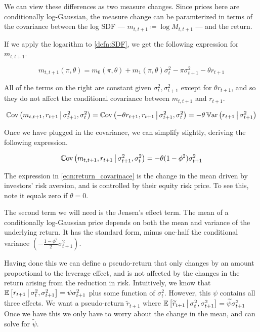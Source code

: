 \documentclass[11pt, letterpaper, twoside, final]{article}
\begin{document}
We can view these differences as two measure changes.
Since prices here are conditionally log-Gaussian, the measure change  can be paramterized in terms of the
covariance between the log SDF --- $m_{t,t+1} \coloneqq \log M_{t,t+1}$ --- and the return.

If we apply the logarithm to \cref{defn:SDF}, we get the following expression for $m_{t,t+1}$.

\begin{equation}
    \label{eqn:log_sdf}
        m_{t,t+1}(\pi, \theta) = m_{0}(\pi, \theta) + m_1(\pi, \theta) \sigma_t^2 - \pi \sigma^2_{t+1} - \theta
        r_{t+1}
\end{equation}

All of the terms on the right are constant given $\sigma^2_t, \sigma^2_{t+1}$ except for $\theta r_{t+1}$, and so
they do not affect the conditional covariance between $m_{t,t+1}$ and $r_{t+1}$.

\begin{equation}
    \Cov\left(m_{t,t+1}, r_{t+1} \mvert \sigma^2_{t+1}, \sigma^2_t \right)   
%
    = \Cov\left(-\theta r_{t+1}, r_{t+1} \mvert \sigma^2_{t+1}, \sigma^2_t \right)   
%
    = -\theta \Var\left(r_{t+1} \mvert \sigma^2_{t+1}\right)   
\end{equation}

Once we have plugged in the covariance, we can simplify slightly, deriving the following expression.

\begin{equation}
    \label{eqn:return_covarinace}
    \Cov\left(m_{t,t+1}, r_{t+1} \mvert \sigma^2_{t+1}, \sigma^2_t \right)   
%
    = -\theta (1 - \phi^2) \sigma^2_{t+1} 
\end{equation}

The expression in \cref{eqn:return_covarinace} is the change in the mean driven by investors' risk aversion, and
is controlled by their equity risk price.
To see this, note it equals zero if $\theta = 0$.

The second term we will need is the Jensen's effect term.
The mean of a conditionally log-Gaussian price depends on both the mean and variance of the underlying return.
It has the standard form, minus one-half the conditional variance $\left(-\frac{1 - \phi^2}{2}
\sigma^2_{t+1}\right)$. 

Having done this we can define a pseudo-return that only changes by an amount proportional to the leverage
effect, and is not affected by the changes in the return arising from the reduction in risk.
Intuitively, we know that $\operatorname{\mathbb{E}}\left[r_{t+1} \,\middle\vert\, \sigma^2_t, \sigma^2_{t+1} \right] = \psi \sigma^2_{t+1}$
plus some function  of $\sigma^2_t$.
However, this $\psi$ contains all three effects.
We want a pseudo-return $\widetilde{r}_{t+1}$ where $\operatorname{\mathbb{E}}\left[\widetilde{r}_{t+1} \,\middle\vert\, \sigma^2_t,
\sigma^2_{t+1} \right] = \widetilde{\psi} \sigma^2_{t+1}$
Once we have this we only have to worry about the change in the mean, and can solve for $\tilde{\psi}$.
\end{document}
